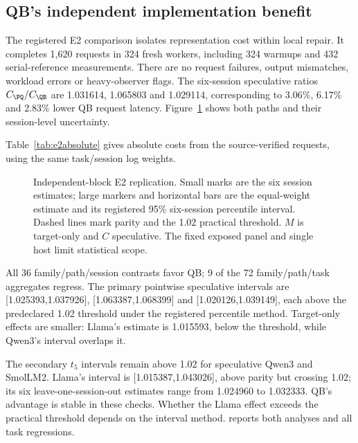 \subsection{QB's independent implementation benefit}
\label{sec:e2}
The registered E2 comparison isolates representation cost within local repair. It completes 1,620 requests in 324 fresh workers, including 324 warmups and 432 serial-reference measurements. There are no request failures, output mismatches, workload errors or heavy-observer flags. The six-session speculative ratios $C_{\PQ}/C_{\QB}$ are 1.031614, 1.065803 and 1.029114, corresponding to 3.06\%, 6.17\% and 2.83\% lower QB request latency. Figure~\ref{fig:e2} shows both paths and their session-level uncertainty.

Table~\ref{tab:e2absolute} gives absolute costs from the source-verified requests, using the same task/session log weights.
\begin{table}[t]\centering\small
\caption{Absolute E2 request costs (ms), with equal task and session weights in the geometric mean. Registered warmups are excluded; the paid interval includes submission, full-response parsing and endpoint validation.}\label{tab:e2absolute}

\end{table}

\begin{figure}[t]\centering

\caption{Independent-block E2 replication. Small marks are the six session estimates; large markers and horizontal bars are the equal-weight estimate and its registered 95\% six-session percentile interval. Dashed lines mark parity and the 1.02 practical threshold. $M$ is target-only and $C$ speculative. The fixed exposed panel and single host limit statistical scope.}
\label{fig:e2}
\end{figure}

All 36 family/path/session contrasts favor QB; 9 of the 72 family/path/task aggregates regress. The primary pointwise speculative intervals are [1.025393,1.037926], [1.063387,1.068399] and [1.020126,1.039149], each above the predeclared 1.02 threshold under the registered percentile method. Target-only effects are smaller: Llama's estimate is 1.015593, below the threshold, while Qwen3's interval overlaps it.

The secondary $t_5$ intervals remain above 1.02 for speculative Qwen3 and SmolLM2. Llama's interval is [1.015387,1.043026], above parity but crossing 1.02; its six leave-one-session-out estimates range from 1.024960 to 1.032333. QB's advantage is stable in these checks. Whether the Llama effect exceeds the practical threshold depends on the interval method.  reports both analyses and all task regressions.


